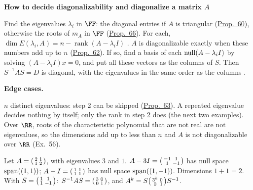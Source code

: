 \documentclass[10pt]{scrartcl}
\newenvironment{methodbox}[1]{\begin{mdframed}[style=mdbluebox,linecolor=NavyBlue,backgroundcolor=NavyBlue!3]\textbf{\color{NavyBlue}#1}\par\vspace{2pt}}{\end{mdframed}}
\begin{document}
\begin{methodbox}{How to decide diagonalizability and diagonalize a matrix $A$}
\begin{enumerate}[label=\arabic*.,leftmargin=1.5em,itemsep=2pt,topsep=2pt]
  \ii Find the eigenvalues $\lambda_i$ in $\FF$: the diagonal entries if $A$ is triangular (\hyperref[prop-60]{Prop.~60}), otherwise the roots of $m_A$ in $\FF$ (\hyperref[prop-66]{Prop.~66}).
  \ii For each, $\dim E(\lambda_i,A)=n-\operatorname{rank}(A-\lambda_iI)$ . $A$ is diagonalizable exactly when these numbers add up to $n$ (\hyperref[prop-62]{Prop.~62}).
  \ii If so, find a basis of each $\operatorname{null}(A-\lambda_iI)$ by solving $(A-\lambda_iI)x=0$, and put all these vectors as the columns of $S$. Then $S^{-1}AS=D$ is diagonal, with the eigenvalues in the same order as the columns .
\end{enumerate}
\textbf{Edge cases.}
\begin{itemize}
  \ii $n$ distinct eigenvalues: step 2 can be skipped (\hyperref[prop-63]{Prop.~63}).
  \ii A repeated eigenvalue decides nothing by itself; only the rank in step 2 does (the next two examples).
  \ii Over $\RR$, roots of the characteristic polynomial that are not real are not eigenvalues, so the dimensions add up to less than $n$ and $A$ is not diagonalizable over $\RR$ (Ex.~56).
\end{itemize}
\end{methodbox}

\begin{example*}
  Let $A=\begin{psmallmatrix}2&1\\1&2\end{psmallmatrix}$, with eigenvalues $3$ and $1$. $A-3I=\begin{psmallmatrix}-1&1\\1&-1\end{psmallmatrix}$ has null space $\operatorname{span}((1,1))$; $A-I=\begin{psmallmatrix}1&1\\1&1\end{psmallmatrix}$ has null space $\operatorname{span}((1,-1))$. Dimensions $1+1=2$. With $S=\begin{psmallmatrix}1&1\\1&-1\end{psmallmatrix}$: $S^{-1}AS=\begin{psmallmatrix}3&0\\0&1\end{psmallmatrix}$, and $A^k=S\begin{psmallmatrix}3^k&0\\0&1\end{psmallmatrix}S^{-1}$.
\end{example*}
\end{document}
